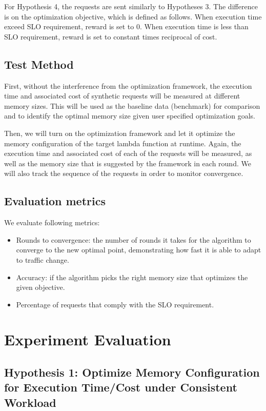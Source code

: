 \documentclass[conference]{IEEEtran}
\begin{document}
For Hypothesis 4, the requests are sent similarly to Hypotheses 3. The difference is on the optimization objective, which is defined as follows.
When execution time exceed SLO requirement, reward is set to 0.
When execution time is less than SLO requirement, reward is set to constant times reciprocal of cost.

\subsection{Test Method}

First, without the interference from the optimization framework, the execution time and associated cost of synthetic requests will be measured at different memory sizes. This will be used as the baseline data (benchmark) for comparison and to identify the optimal memory size given user specified optimization goals.

Then, we will turn on the optimization framework and let it optimize the memory configuration of the target lambda function at runtime. Again, the execution time and associated cost of each of the requests will be measured, as well as the memory size that is suggested by the framework in each round. We will also track the sequence of the requests in order to monitor convergence.

\subsection{Evaluation metrics}

We evaluate following metrics:

\begin{itemize}
    \item Rounds to convergence: the number of rounds it takes for the algorithm to converge to the new optimal point, demonstrating how fast it is able to adapt to traffic change.
    \item Accuracy: if the algorithm picks the right memory size that optimizes the given objective. 
    \item Percentage of requests that comply with the SLO requirement.
\end{itemize}


\section{Experiment Evaluation}

\subsection{Hypothesis 1: Optimize Memory Configuration for Execution Time/Cost under Consistent Workload}
\end{document}

